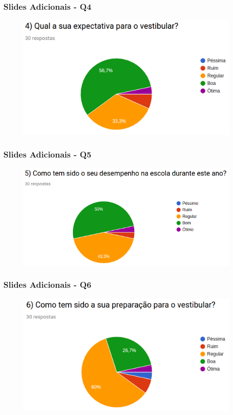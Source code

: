 \begin{frame}
\frametitle{Slides Adicionais - Q4}
\begin{figure}
\centering
\includegraphics[scale=0.55]{figuras/q4.png}
\end{figure}
\end{frame}

\begin{frame}
\frametitle{Slides Adicionais - Q5}
\begin{figure}
\centering
\includegraphics[scale=0.45]{figuras/q5.png}
\end{figure}
\end{frame}

\begin{frame}
\frametitle{Slides Adicionais - Q6}
\begin{figure}
\centering
\includegraphics[scale=0.55]{figuras/q6.png}
\end{figure}
\end{frame}

